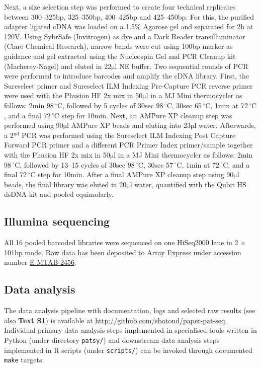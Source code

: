 \documentclass[10pt]{article}
\newcommand{\mul}{\ensuremath{\mathrm{\mu l}}}
\newcommand{\C}{\,$^{\circ}\mathrm{C}$}
\begin{document}
Next, a size selection step was performed to create four technical replicates between 300--325bp, 325--350bp, 400--425bp and 425--450bp. For this, the purified adapter ligated cDNA was loaded on a 1.5\% Agarose gel and separated for 2h at 120V. Using SybrSafe (Invitrogen) as dye and a Dark Reader transilluminator (Clare Chemical Research), narrow bands were cut using 100bp marker as guidance and gel extracted using the Nucleospin Gel and PCR Cleanup kit (Macherey-Nagel) and eluted in 22{\mul} NE buffer.
Two sequential rounds of PCR were performed to introduce barcodes and amplify the cDNA library. First, the Sureselect primer and Sureselect ILM Indexing Pre-Capture PCR reverse primer were used with the Phusion HF 2x mix in 50{\mul} in a MJ Mini thermocycler as follows: 2min 98{\C}, followed by 5 cycles of 30sec 98{\C}, 30sec 65{\C}, 1min at 72{\C}, and a final 72{\C} step for 10min. Next, an AMPure XP cleanup step was performed using 90{\mul} AMPure XP beads and eluting into 23{\mul} water. Afterwards, a 2$^\mathrm{nd}$ PCR was performed using the Sureselect ILM Indexing Post Capture Forward PCR primer and a different PCR Primer Index primer/sample together with the Phusion HF 2x mix in 50{\mul} in a MJ Mini thermocycler as follows: 2min 98{\C}, followed by 13--15 cycles of 30sec 98{\C}, 30sec 57{\C}, 1min at 72{\C}, and a final 72{\C} step for 10min. After a final AMPure XP cleanup step using 90{\mul} beads, the final library was eluted in 20{\mul} water, quantified with the Qubit HS dsDNA kit and pooled equimolarly.

\subsection*{Illumina sequencing}

All 16 pooled barcoded libraries were sequenced on one HiSeq2000 lane in 2 $\times$ 101bp mode. Raw data has been deposited to Array Express under accession number \href{http://www.ebi.ac.uk/arrayexpress/experiments/E-MTAB-2456/}{E-MTAB-2456}.

\subsection*{Data analysis}

The data analysis pipeline with documentation, logs and selected raw results (see also \textbf{Text S1}) is available at \href{http://github.com/sbotond/paper-pat-seq}{http://github.com/sbotond/paper-pat-seq}. Individual primary data analysis steps implemented in specialised tools written in Python (under directory \texttt{patsy/})  and downstream data analysis steps implemented in R scripts (under \texttt{scripts/}) can be invoked through documented \texttt{make} targets.
\end{document}
